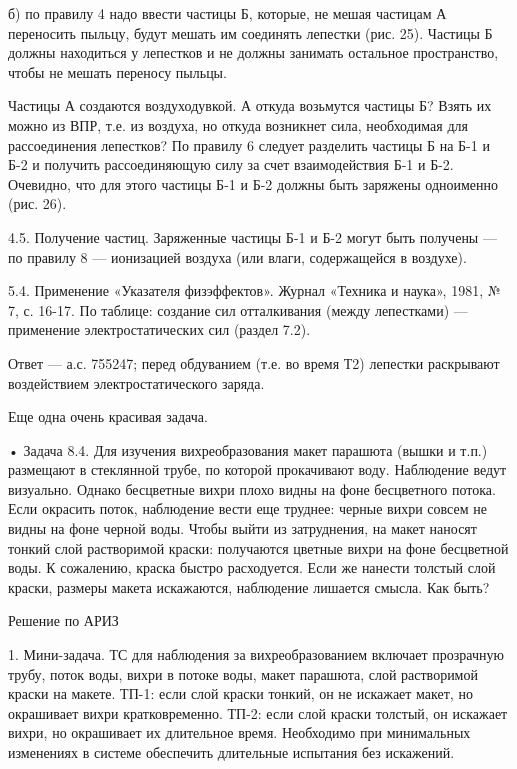 б) по  правилу 4 надо ввести  частицы Б, которые, не  мешая частицам А
переносить  пыльцу,  будут мешать  им  соединять  лепестки (рис.  25).
Частицы Б должны находиться у лепестков и не должны занимать остальное
пространство, чтобы не мешать переносу пыльцы.

Частицы  А  создаются воздуходувкой.  А  откуда  возьмутся частицы  Б?
Взять  их  можно  из  ВПР,   т.е.  из  воздуха,  но  откуда  возникнет
сила, необходимая  для рассоединения  лепестков? По правилу  6 следует
разделить частицы  Б на Б-1  и Б-2  и получить рассоединяющую  силу за
счет взаимодействия Б-1  и Б-2. Очевидно, что для этого  частицы Б-1 и
Б-2 должны быть заряжены одноименно (рис. 26).

4.5.  Получение  частиц.  Заряженные  частицы Б-1  и  Б-2  могут  быть
получены — по правилу 8  — ионизацией воздуха (или влаги, содержащейся
в воздухе).

5.4.  Применение «Указателя  физэффектов». Журнал  «Техника и  наука»,
1981,  № 7,  с. 16-17.  По таблице:  создание сил  отталкивания (между
лепестками) — применение электростатических сил (раздел 7.2).

Ответ  — а.с.  755247; перед  обдуванием (т.е.  во время  Т2) лепестки
раскрывают воздействием электростатического заряда.



Еще одна очень красивая задача.

• Задача  8.4. Для изучения  вихреобразования макет парашюта  (вышки и
т.п.)  размещают  в стеклянной  трубе,  по  которой прокачивают  воду.
Наблюдение  ведут визуально.  Однако бесцветные  вихри плохо  видны на
фоне  бесцветного потока.  Если окрасить  поток, наблюдение  вести еще
труднее: черные вихри совсем не видны на фоне черной воды. Чтобы выйти
из  затруднения,  на макет  наносят  тонкий  слой растворимой  краски:
получаются цветные вихри на фоне  бесцветной воды. К сожалению, краска
быстро  расходуется.  Если же  нанести  толстый  слой краски,  размеры
макета искажаются, наблюдение лишается смысла. Как быть?

Решение по АРИЗ

1.  Мини-задача.  ТС  для  наблюдения  за  вихреобразованием  включает
прозрачную трубу,  поток воды,  вихри в  потоке воды,  макет парашюта,
слой растворимой краски  на макете. ТП-1: если слой  краски тонкий, он
не искажает макет, но окрашивает вихри кратковременно. ТП-2: если слой
краски толстый, он искажает вихри,  но окрашивает их длительное время.
Необходимо при минимальных изменениях  в системе обеспечить длительные
испытания без искажений.

